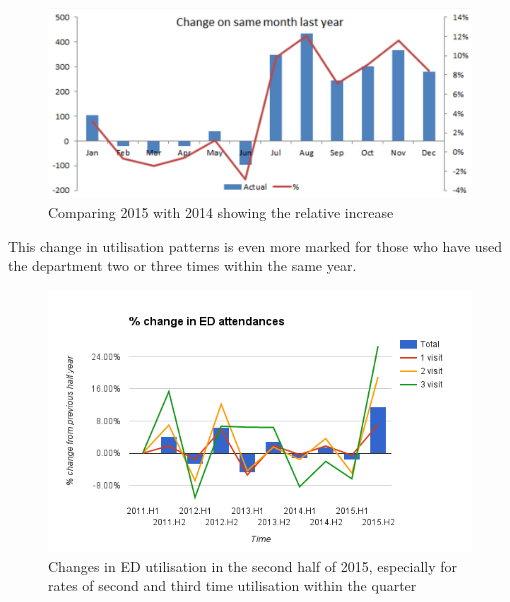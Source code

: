 \documentclass[11pt,a4paper]{article}
\begin{document}
\begin{figure}[htp]
\centering
\includegraphics[scale=0.35]{ED.png}
\caption{Comparing 2015 with 2014 showing the relative increase}
\label{Relative changes in ED utilisation}
\end{figure}


This change in utilisation patterns is even more marked for those who have used the department two or three times within the same year.\\


\begin{figure}[htp]
\centering
\includegraphics[scale=0.70]{Fchange.png}
\caption{Changes in ED utilisation in the second half of 2015, especially for rates of second and third time utilisation within the quarter}
\label{Changes in ED utilisation}
\end{figure}
\end{document}
